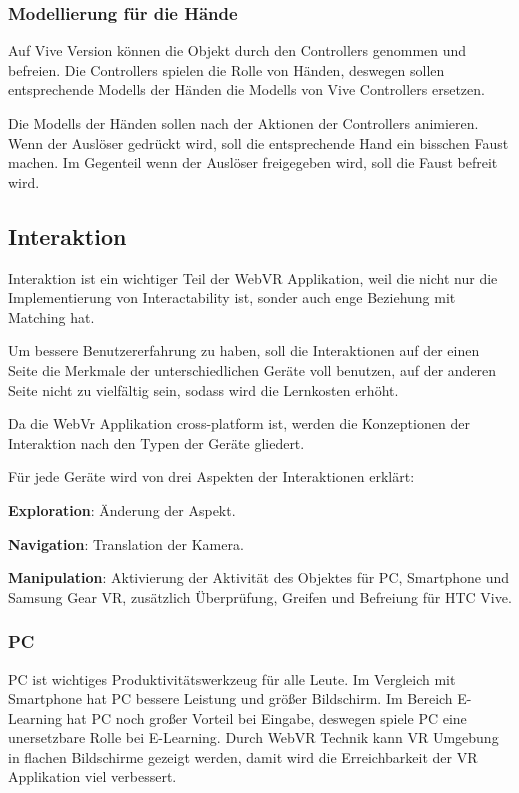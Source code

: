    \subsubsection{Modellierung für die Hände}
   Auf Vive Version können die Objekt durch den Controllers genommen und befreien. Die Controllers spielen die Rolle von Händen, deswegen sollen entsprechende Modells der Händen die Modells von Vive Controllers ersetzen.
   
   Die Modells der Händen sollen nach der Aktionen der Controllers animieren. Wenn der Auslöser gedrückt wird, soll die entsprechende Hand ein bisschen Faust machen. Im Gegenteil wenn der Auslöser freigegeben wird, soll die Faust befreit wird.


 \subsection{Interaktion}
 Interaktion ist ein wichtiger Teil der WebVR Applikation, weil die nicht nur die Implementierung von Interactability ist, sonder auch enge Beziehung mit Matching hat.
 
 Um bessere Benutzererfahrung zu haben, soll die Interaktionen auf der einen Seite die Merkmale der unterschiedlichen Geräte voll benutzen, auf der anderen Seite nicht zu vielfältig sein, sodass wird die Lernkosten erhöht. 
 
 Da die WebVr Applikation cross-platform ist, werden die Konzeptionen der Interaktion nach den Typen der Geräte gliedert.

 Für jede Geräte wird von drei Aspekten der Interaktionen erklärt:
 
 \textbf{Exploration}: Änderung der Aspekt.
 
 \textbf{Navigation}: Translation der Kamera.
 
 \textbf{Manipulation}: Aktivierung der Aktivität des Objektes für PC, Smartphone und Samsung Gear VR, zusätzlich Überprüfung, Greifen und Befreiung für HTC Vive.

 \subsubsection{PC}
 PC ist wichtiges Produktivitätswerkzeug für alle Leute. Im Vergleich mit Smartphone hat PC bessere Leistung und größer Bildschirm. Im Bereich E-Learning hat PC noch großer Vorteil bei Eingabe, deswegen spiele PC eine unersetzbare Rolle bei E-Learning. Durch WebVR Technik kann VR Umgebung in flachen Bildschirme gezeigt werden, damit wird die Erreichbarkeit der VR Applikation viel verbessert. 
 
